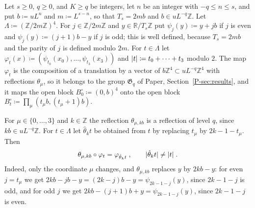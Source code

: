 \documentclass[11pt]{preprint}
\DeclarePairedDelimiter{\abs}{\lvert}{\rvert}
\numberwithin{equation}{section}
\theoremstyle{definition}
\theoremstyle{remark}
\theoremstyle{plain}
\begin{document}
Let $s \geq 0$, $q \geq 0$, and $K \geq q$ be integers, let $n$ be an integer with $-q \leq n \leq s$, and put $b \coloneqq uL^n$ and $m \coloneqq L^{s-n}$, so that $T_s = 2mb$ and $b \in uL^{-q}\mathbb Z$. Let $\Lambda \coloneqq (\mathbb Z/2m\mathbb Z)^4$. For $j \in \mathbb Z/2m\mathbb Z$ and $y \in \mathbb R/T_s\mathbb Z$ put $\psi_j(y) \coloneqq y + jb$ if $j$ is even and $\psi_j(y) \coloneqq (j + 1)b - y$ if $j$ is odd; this is well defined, because $T_s = 2mb$ and the parity of $j$ is defined modulo $2m$. For $t \in \Lambda$ let $\varphi_t(x) \coloneqq (\psi_{t_0}(x_0), \dots, \psi_{t_3}(x_3))$ and $\abs{t} \coloneqq t_0 + \dots + t_3$ modulo $2$. The map $\varphi_t$ is the composition of a translation by a vector of $b\mathbb Z^4 \subset uL^{-q}\mathbb Z^4$ with reflections $\theta_\mu$, so it belongs to the group $\mathfrak G_q$ of Paper, Section~\ref{P-sec:results}, and it maps the open block $B^\circ_0 \coloneqq (0, b)^4$ onto the open block $B^\circ_t \coloneqq \prod_\mu(t_\mu b, (t_\mu + 1)b)$.

For $\mu \in \{ 0, \dots, 3 \}$ and $k \in \mathbb Z$ the reflection $\theta_{\mu,kb}$ is a reflection of level $q$, since $kb \in uL^{-q}\mathbb Z$. For $t \in \Lambda$ let $\hat\theta_kt$ be obtained from $t$ by replacing $t_\mu$ by $2k - 1 - t_\mu$. Then
\begin{equation}\label{eq:reflected-block-map}
    \theta_{\mu,kb} \circ \varphi_t = \varphi_{\hat\theta_kt}\;,
    \qquad
    \abs{\hat\theta_kt} \neq \abs{t}\;.
\end{equation}
Indeed, only the coordinate $\mu$ changes, and $\theta_{\mu,kb}$ replaces $y$ by $2kb - y$: for even $j = t_\mu$ we get $2kb - jb - y = (2k - j)b - y = \psi_{2k-1-j}(y)$, since $2k - 1 - j$ is odd, and for odd $j$ we get $2kb - (j + 1)b + y = \psi_{2k-1-j}(y)$, since $2k - 1 - j$ is even.
\end{document}
